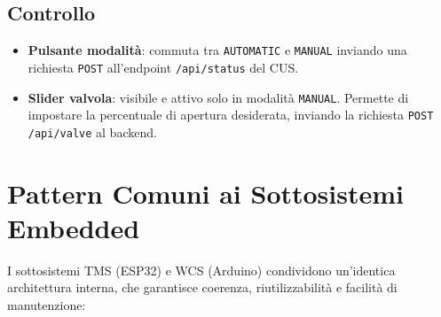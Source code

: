 \documentclass[12pt, a4paper]{article}
\begin{document}
\subsection{Controllo}

\begin{itemize}
    \item \textbf{Pulsante modalità}: commuta tra \texttt{AUTOMATIC} e \texttt{MANUAL} inviando una richiesta \texttt{POST} all'endpoint \texttt{/api/status} del CUS.
    \item \textbf{Slider valvola}: visibile e attivo solo in modalità \texttt{MANUAL}. Permette di impostare la percentuale di apertura desiderata, inviando la richiesta \texttt{POST /api/valve} al backend.
\end{itemize}

\section{Pattern Comuni ai Sottosistemi Embedded}

I sottosistemi TMS (ESP32) e WCS (Arduino) condividono un'identica architettura interna, che garantisce coerenza, riutilizzabilità e facilità di manutenzione:
\end{document}
